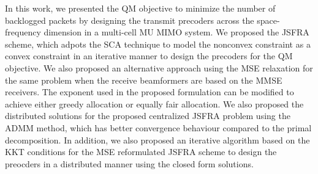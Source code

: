 
In this work, we presented the \acl{QM} objective to minimize the number of backlogged packets by designing the transmit precoders across the space-frequency dimension in a multi-cell \ac{MU} \ac{MIMO} system. We proposed the \ac{JSFRA} scheme, which adpots the \ac{SCA} technique to model the nonconvex constraint as a convex constraint in an iterative manner to design the precoders for the \acl{QM} objective. We also proposed an alternative approach using the \ac{MSE} relaxation for the same problem when the receive beamformers are based on the \ac{MMSE} receivers. The exponent used in the proposed formulation can be modified to achieve either greedy allocation or equally fair allocation. We also proposed the distributed solutions for the proposed centralized \ac{JSFRA} problem using the \ac{ADMM} method, which has better convergence behaviour compared to the primal decomposition. In addition, we also proposed an iterative algorithm based on the \ac{KKT} conditions for the \ac{MSE} reformulated \ac{JSFRA} scheme to design the preocders in a distributed manner using the closed form solutions.